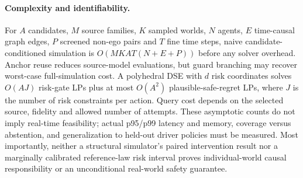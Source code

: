 \documentclass[10pt]{article}
\begin{document}
\paragraph{Complexity and identifiability.}
For $A$ candidates, $M$ source families, $K$ sampled worlds, $N$ agents, $E$ time-causal graph edges, $P$ screened non-ego pairs and $T$ fine time steps, naive candidate-conditioned simulation is $O(MKAT(N+E+P))$ before any solver overhead. Anchor reuse reduces source-model evaluations, but guard branching may recover worst-case full-simulation cost. A polyhedral DSE with $d$ risk coordinates solves $O(AJ)$ risk-gate LPs plus at most $O(A^2)$ plausible-safe-regret LPs, where $J$ is the number of risk constraints per action. Query cost depends on the selected source, fidelity and allowed number of attempts. These asymptotic counts do not imply real-time feasibility; actual p95/p99 latency and memory, coverage versus abstention, and generalization to held-out driver policies must be measured. Most importantly, neither a structural simulator's paired intervention result nor a marginally calibrated reference-law risk interval proves individual-world causal responsibility or an unconditional real-world safety guarantee.

\printbibliography
\end{document}
